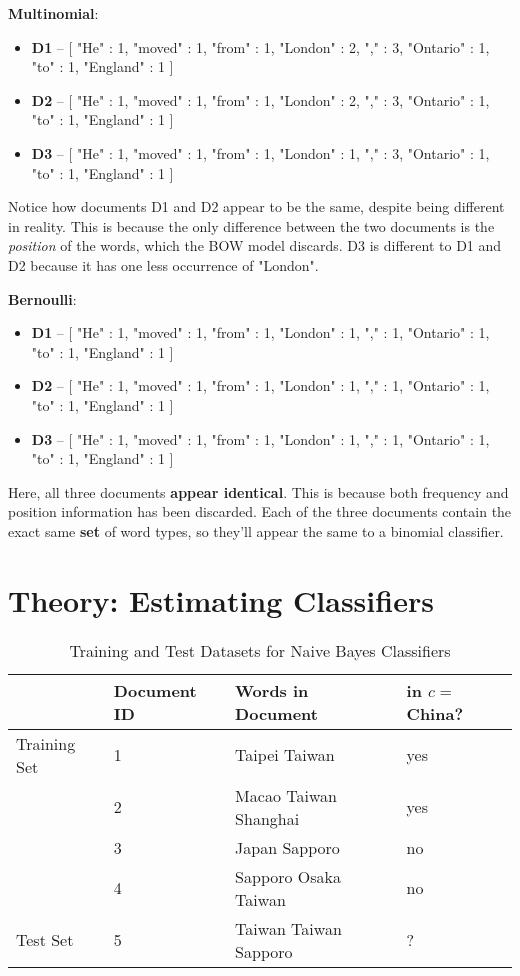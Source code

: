 \documentclass{article}
\begin{document}
\hspace{1pt}

\textbf{Multinomial}:
\begin{itemize}
	\item \textbf{D1} -- [ "He" : 1, "moved" : 1, "from" : 1, "London" : 2, "," : 3, "Ontario" : 1, "to" : 1, "England" : 1 ]
	\item \textbf{D2} -- [ "He" : 1, "moved" : 1, "from" : 1, "London" : 2, "," : 3, "Ontario" : 1, "to" : 1, "England" : 1 ]
	\item \textbf{D3} -- [ "He" : 1, "moved" : 1, "from" : 1, "London" : 1, "," : 3, "Ontario" : 1, "to" : 1, "England" : 1 ]
\end{itemize}
Notice how documents D1 and D2 appear to be the same, despite being different in reality. This is because the only difference between the two documents is the \textit{position} of the words, which the BOW model discards. D3 is different to D1 and D2 because it has one less occurrence of "London".

\hspace{1pt}

\textbf{Bernoulli}:
\begin{itemize}
	\item \textbf{D1} -- [ "He" : 1, "moved" : 1, "from" : 1, "London" : 1, "," : 1, "Ontario" : 1, "to" : 1, "England" : 1 ]
	\item \textbf{D2} -- [ "He" : 1, "moved" : 1, "from" : 1, "London" : 1, "," : 1, "Ontario" : 1, "to" : 1, "England" : 1 ]
	\item \textbf{D3} -- [ "He" : 1, "moved" : 1, "from" : 1, "London" : 1, "," : 1, "Ontario" : 1, "to" : 1, "England" : 1 ]
\end{itemize}
Here, all three documents \textbf{appear identical}. This is because both frequency and position information has been discarded. Each of the three documents contain the exact same \textbf{set} of word types, so they'll appear the same to a binomial classifier.

\section{Theory: Estimating Classifiers}

\begin{table}[h]
	\centering
	\begin{tabular}{|l|l|l|l|}
	\hline
	& \textbf{Document ID} & \textbf{Words in Document} & \textbf{in $c=$China?} \\
	\hline
	Training Set & 1 & Taipei Taiwan & yes \\
	& 2 & Macao Taiwan Shanghai & yes \\
	& 3 & Japan Sapporo & no \\
	& 4 & Sapporo Osaka Taiwan & no \\
	\hline
	Test Set & 5 & Taiwan Taiwan Sapporo & ? \\
	\hline 
	\end{tabular}
	\caption{Training and Test Datasets for Naive Bayes Classifiers}
	\label{tab:example_problem}
\end{table}
\end{document}
